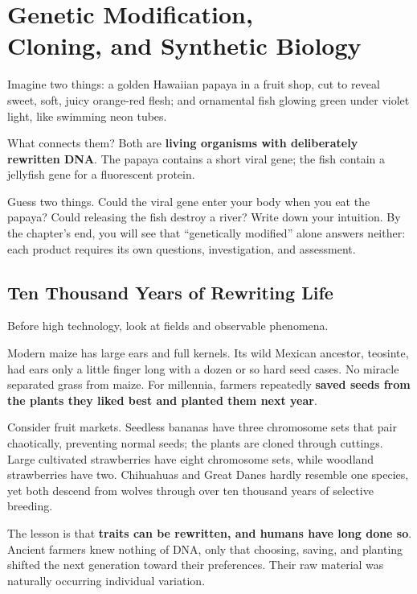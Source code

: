 \chapter[Genetic Modification, Cloning, and Synthetic Biology]{Genetic Modification,\protect\\ Cloning, and Synthetic Biology}

\begin{kaichang}
Imagine two things: a golden Hawaiian papaya in a fruit shop, cut to reveal sweet, soft, juicy orange-red flesh; and ornamental fish glowing green under violet light, like swimming neon tubes.

What connects them? Both are \textbf{living organisms with deliberately rewritten DNA}. The papaya contains a short viral gene; the fish contain a jellyfish gene for a fluorescent protein.

Guess two things. Could the viral gene enter your body when you eat the papaya? Could releasing the fish destroy a river? Write down your intuition. By the chapter's end, you will see that ``genetically modified'' alone answers neither: each product requires its own questions, investigation, and assessment.
\end{kaichang}

\section{Ten Thousand Years of Rewriting Life}

Before high technology, look at fields and observable phenomena.

Modern maize has large ears and full kernels. Its wild Mexican ancestor, teosinte, had ears only a little finger long with a dozen or so hard seed cases. No miracle separated grass from maize. For millennia, farmers repeatedly \textbf{saved seeds from the plants they liked best and planted them next year}.

Consider fruit markets. Seedless bananas have three chromosome sets that pair chaotically, preventing normal seeds; the plants are cloned through cuttings. Large cultivated strawberries have eight chromosome sets, while woodland strawberries have two. Chihuahuas and Great Danes hardly resemble one species, yet both descend from wolves through over ten thousand years of selective breeding.

The lesson is that \textbf{traits can be rewritten, and humans have long done so}. Ancient farmers knew nothing of DNA, only that choosing, saving, and planting shifted the next generation toward their preferences. Their raw material was naturally occurring individual variation.

